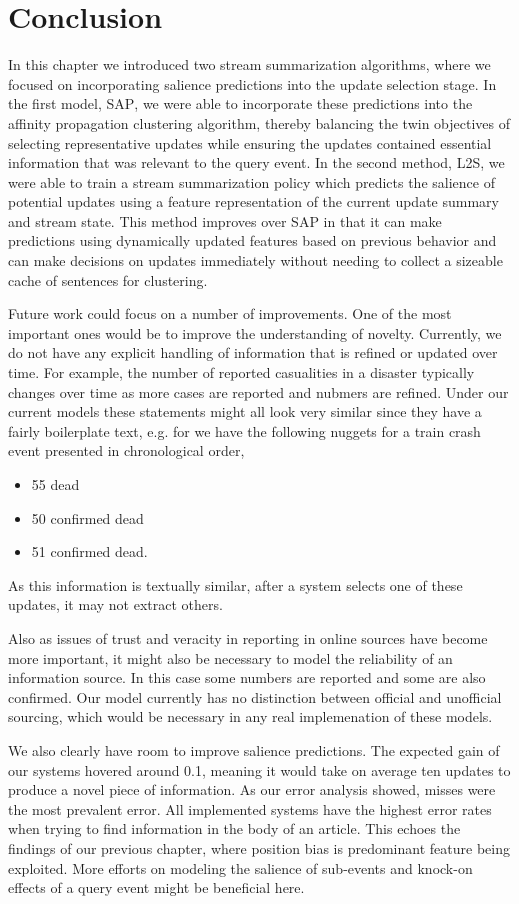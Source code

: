 \section{Conclusion}

In this chapter we introduced two stream summarization algorithms, 
where
we focused on incorporating salience predictions into the update
selection stage. In the first model, \textsc{SAP}, we were able to
incorporate these predictions into the affinity propagation clustering 
algorithm, thereby balancing the twin objectives of selecting representative
updates while ensuring the updates contained essential information that 
was relevant to the query event. In the second method,  \textsc{L2S},
we were able to train a stream summarization policy which predicts the salience
of potential updates using a feature representation of the current update
summary and stream state. This method improves over \textsc{SAP}
in that it can make predictions using dynamically updated features based
on previous behavior and can make decisions on updates immediately
 without needing to collect a sizeable cache of sentences for clustering.

Future work could focus on a number of improvements. One of the most important
ones would be to improve the understanding of novelty. Currently, we do not
have any explicit handling of information that is refined or updated over time.
For example, the number of reported casualities in a disaster typically
changes over time as more cases are reported and nubmers are refined. 
Under our current models
these statements might all look very similar since they have a fairly 
boilerplate text, e.g. for we have the following nuggets for a train 
crash event presented in chronological order,
\begin{itemize}
\item 55 dead
\item 50 confirmed dead
\item 51 confirmed dead.
\end{itemize}
As this information is textually similar, after a system selects one of these
updates, it may not extract others.

Also as issues of trust and veracity in reporting in online sources have become more important,
it might also be necessary to model the reliability of an information 
source. In this
case some numbers are reported and some are also confirmed. Our model
currently has no distinction between official and unofficial sourcing,
which would be necessary in any real implemenation of these models.

We also clearly have room to improve salience predictions. The expected gain
of our systems hovered around 0.1, meaning it would take on average ten updates to produce a novel piece of information. As our error analysis showed,
misses were the most prevalent error. All implemented
systems have the highest error rates when trying to find information in the 
body of an article. This echoes the findings of our previous chapter, where
position bias is predominant feature being exploited. More efforts on 
modeling the salience of sub-events and knock-on effects of a query event
might be beneficial here. 


